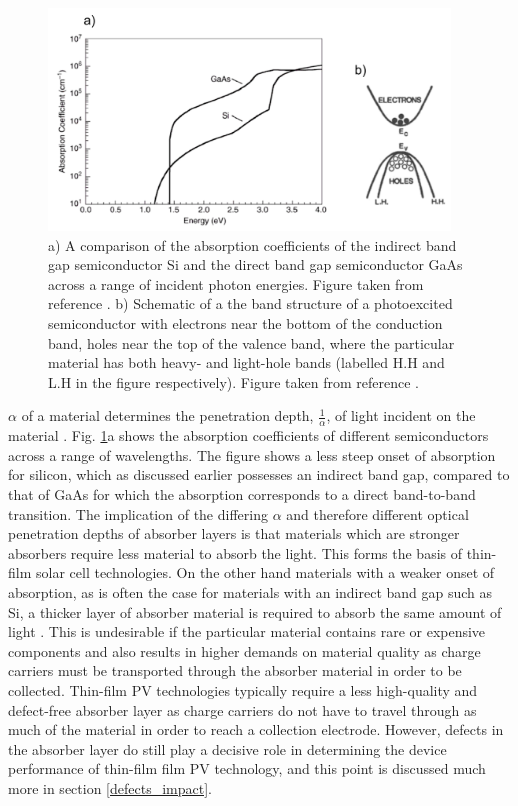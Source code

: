 \documentclass[11pt, twoside]{report}
\begin{document}
\begin{figure}[h!]
  \centering
    \includegraphics[width=0.95\textwidth]{figures/ab+m_eff.png}
    \caption{a) A comparison of the absorption coefficients of the indirect band gap semiconductor Si and the direct band gap semiconductor GaAs across a range of incident photon energies. Figure taken from reference . b) Schematic of a the band structure of a photoexcited semiconductor with electrons near the bottom of the conduction band, holes near the top of the valence band, where the particular material has both heavy- and light-hole bands (labelled H.H and L.H in the figure respectively). Figure taken from reference .}
  \label{ab+m_eff}
\end{figure}

$\alpha$ of a material determines the penetration depth, $\frac{1}{\alpha}$, of light incident on the material \cite{absorption_coeff_book1}. Fig. \ref{ab+m_eff}a shows the absorption coefficients of different semiconductors across a range of wavelengths. The figure shows a less steep onset of absorption for silicon, which as discussed earlier possesses an indirect band gap, compared to that of GaAs for which the absorption corresponds to a direct band-to-band transition. 
The implication of the differing $\alpha$ and therefore different optical penetration depths of absorber layers is that materials which are stronger absorbers require less material to absorb the light. This forms the basis of thin-film solar cell technologies.
On the other hand materials with a weaker onset of absorption, as is often the case for materials with an indirect band gap such as Si, a thicker layer of absorber material is required to absorb the same amount of light \cite{PV_bands_book}. This is undesirable if the particular material contains rare or expensive components and also results in higher demands on material quality as charge carriers must be transported through the absorber material in order to be collected.
Thin-film PV technologies typically require a less high-quality and defect-free absorber layer as charge carriers do not have to travel through as much of the material in order to reach a collection electrode. However, defects in the absorber layer do still play a decisive role in determining the device performance of thin-film film PV technology, and this point is discussed much more in section \ref{defects_impact}.
\end{document}
